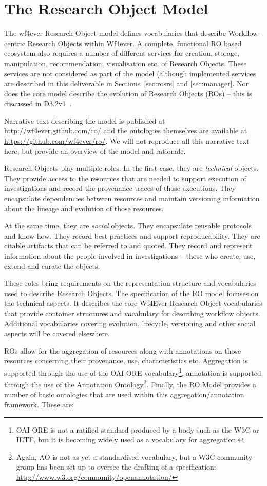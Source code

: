 \section{The Research Object Model}
\label{sec:model}

The wf4ever Research Object model defines vocabularies that describe Workflow-centric Research Objects within Wf4ever. A complete, functional RO based ecosystem also requires a number of different services for creation, storage, manipulation, recommendation, visualisation etc. of Research Objects. These services are not considered as part of the model (although implemented services are described in this deliverable in Sections~\ref{sec:rosrs} and \ref{sec:manager}. Nor does the core model describe the evolution of Research Objects (ROs) -- this is discussed in D3.2v1~\cite{D3.2v1}.

Narrative text describing the model is published at \url{http://wf4ever.github.com/ro/} and the ontologies themselves are available at \url{https://github.com/wf4ever/ro/}. We will not reproduce all this narrative text here, but provide an overview of the model and rationale.

Research Objects play multiple roles. In the first case, they are \emph{technical} objects. They provide access to the resources that are needed to support execution of investigations and record the provenance traces of those executions. They encapsulate dependencies between resources and maintain versioning information about the lineage and evolution of those resources.

At the same time, they are \emph{social} objects. They encapsulate reusable protocols and know-how. They record best practices and support reproducability. They are citable artifacts that can be referred to and quoted. They record and represent information about the people involved in investigations -- those who create, use, extend and curate the objects.

These roles bring requirements on the representation structure and vocabularies used to describe Research Objects. The specification of the RO model focuses on the technical aspects. It describes the core Wf4Ever Research Object vocabularies that provide container structures and vocabulary for describing workflow objects. Additional vocabularies covering evolution, lifecycle, versioning and other social aspects will be covered elsewhere.


ROs allow for the aggregation of resources along with annotations on
those resources concerning their provenance, use, characteristics
etc. Aggregation is supported through the use of the OAI-ORE
vocabulary\footnote{OAI-ORE is not a ratified standard
  produced by a body such as the W3C or IETF, but it is becoming
  widely used as a vocabulary for aggregation.}, annotation is
supported through the use of the Annotation Ontology\footnote{Again,
  AO is not as yet a standardised vocabulary, but a W3C community
  group has been set up to oversee the drafting of a specification: \url{http://www.w3.org/community/openannotation/}}. Finally, the RO Model provides a number of basic ontologies that are used within this aggregation/annotation framework. These are:

